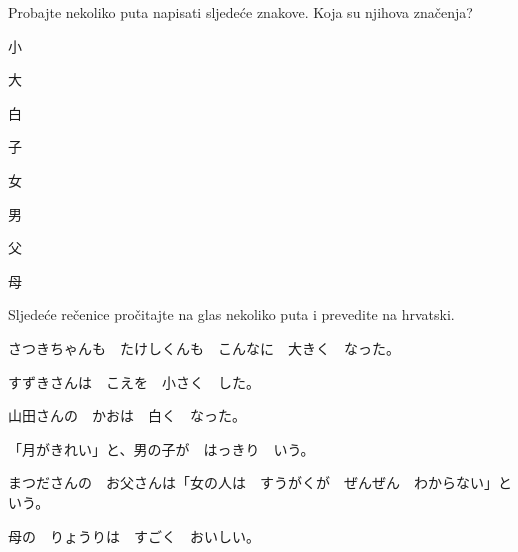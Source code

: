 
\author{Tomislav Mamić}

	
	\begin{mondai}{Probajte nekoliko puta napisati sljedeće znakove. Koja su njihova značenja?}
		\item 小
		\item 大
		\item 白
		\item 子
		\item 女
		\item 男
		\item 父
		\item 母
	\end{mondai}

	\begin{mondai}{Sljedeće rečenice pročitajte na glas nekoliko puta i prevedite na hrvatski.}
		\item さつきちゃんも　たけしくんも　こんなに　大きく　なった。
		\item すずきさんは　こえを　小さく　した。
		\item 山田さんの　かおは　白く　なった。
		\item 「月がきれい」と、男の子が　はっきり　いう。
		\item まつださんの　お父さんは「女の人は　すうがくが　ぜんぜん　わからない」と　いう。
		\item 母の　りょうりは　すごく　おいしい。
	\end{mondai}
